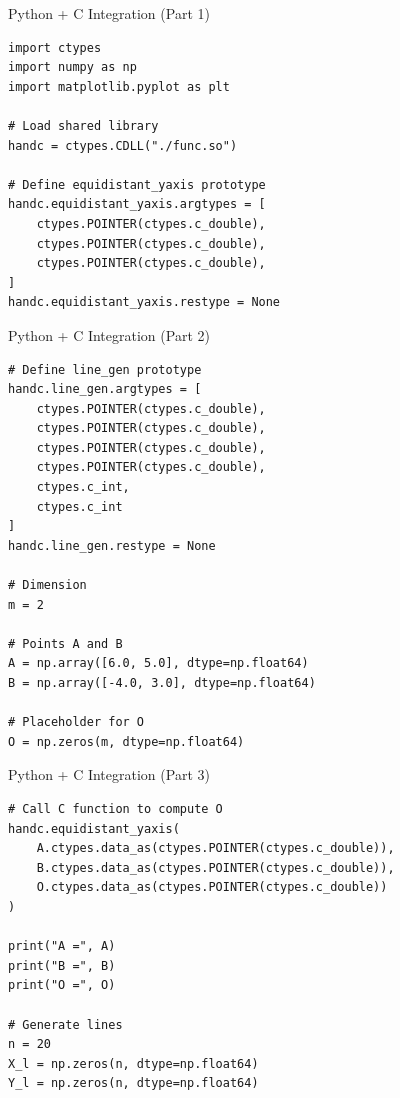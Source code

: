 \documentclass{beamer}
\begin{document}
\begin{frame}[fragile]{Python + C Integration (Part 1)}
\begin{lstlisting}
import ctypes
import numpy as np
import matplotlib.pyplot as plt

# Load shared library
handc = ctypes.CDLL("./func.so")

# Define equidistant_yaxis prototype
handc.equidistant_yaxis.argtypes = [
    ctypes.POINTER(ctypes.c_double),
    ctypes.POINTER(ctypes.c_double),
    ctypes.POINTER(ctypes.c_double),
]
handc.equidistant_yaxis.restype = None
\end{lstlisting}
\end{frame}

\begin{frame}[fragile]{Python + C Integration (Part 2)}
\begin{lstlisting}
# Define line_gen prototype
handc.line_gen.argtypes = [
    ctypes.POINTER(ctypes.c_double),
    ctypes.POINTER(ctypes.c_double),
    ctypes.POINTER(ctypes.c_double),
    ctypes.POINTER(ctypes.c_double),
    ctypes.c_int,
    ctypes.c_int
]
handc.line_gen.restype = None

# Dimension
m = 2

# Points A and B
A = np.array([6.0, 5.0], dtype=np.float64)
B = np.array([-4.0, 3.0], dtype=np.float64)

# Placeholder for O
O = np.zeros(m, dtype=np.float64)
\end{lstlisting}
\end{frame}

\begin{frame}[fragile]{Python + C Integration (Part 3)}
\begin{lstlisting}
# Call C function to compute O
handc.equidistant_yaxis(
    A.ctypes.data_as(ctypes.POINTER(ctypes.c_double)),
    B.ctypes.data_as(ctypes.POINTER(ctypes.c_double)),
    O.ctypes.data_as(ctypes.POINTER(ctypes.c_double))
)

print("A =", A)
print("B =", B)
print("O =", O)

# Generate lines
n = 20
X_l = np.zeros(n, dtype=np.float64)
Y_l = np.zeros(n, dtype=np.float64)
\end{lstlisting}
\end{frame}
\end{document}
